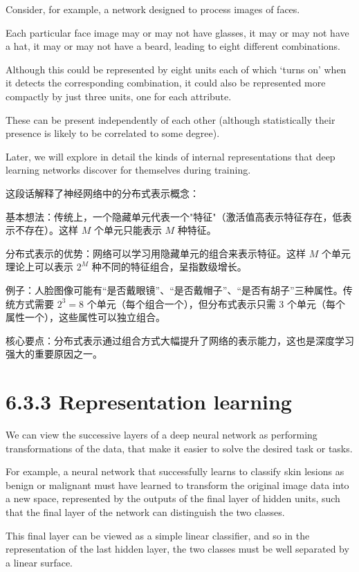 \documentclass{article}
\begin{document}
Consider, for example, a network designed to process images of faces. 

Each particular face image may or may not have glasses, it may or may not have a hat, it may or may not have a beard, leading to eight different combinations. 

Although this could be represented by eight units each of which `turns on' when it detects the corresponding combination, it could also be represented more compactly by just three units, one for each attribute. 

These can be present independently of each other (although statistically their presence is likely to be correlated to some degree). 

Later, we will explore in detail the kinds of internal representations that deep learning networks discover for themselves during training.

{\color{red}
这段话解释了神经网络中的分布式表示概念：

基本想法：传统上，一个隐藏单元代表一个"特征"（激活值高表示特征存在，低表示不存在）。这样 \(M\) 个单元只能表示 \(M\) 种特征。

分布式表示的优势：网络可以学习用隐藏单元的组合来表示特征。这样 \(M\) 个单元理论上可以表示 \(2^M\) 种不同的特征组合，呈指数级增长。

例子：人脸图像可能有“是否戴眼镜”、“是否戴帽子”、“是否有胡子”三种属性。传统方式需要 \(2^3 = 8\) 个单元（每个组合一个），但分布式表示只需 3 个单元（每个属性一个），这些属性可以独立组合。

核心要点：分布式表示通过组合方式大幅提升了网络的表示能力，这也是深度学习强大的重要原因之一。
}

\section{6.3.3 Representation learning}

We can view the successive layers of a deep neural network as performing transformations of the data, that make it easier to solve the desired task or tasks. 

For example, a neural network that successfully learns to classify skin lesions as benign or malignant must have learned to transform the original image data into a new space, represented by the outputs of the final layer of hidden units, such that the final layer of the network can distinguish the two classes. 

This final layer can be viewed as a simple linear classifier, and so in the representation of the last hidden layer, the two classes must be well separated by a linear surface. 
\end{document}
